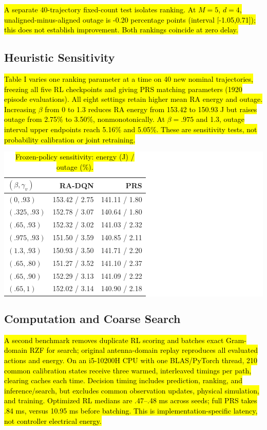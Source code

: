 \documentclass[letterpaper,conference]{IEEEtran}
\newcommand{\rev}[1]{\hl{#1}}
\newcommand{\revbox}[1]{\colorbox{white}{#1}}
\newcommand{\rev}[1]{\hl{#1}}
\newcommand{\revbox}[1]{\colorbox{yellow}{#1}}
\begin{document}
\rev{A separate 40-trajectory fixed-count test isolates ranking. At $M=5$, $d=4$, unaligned-minus-aligned outage is -0.20 percentage points (interval [-1.05,0.71]); this does not establish improvement. Both rankings coincide at zero delay.}

\subsection{Heuristic Sensitivity}
\rev{Table I varies one ranking parameter at a time on 40 new nominal trajectories, freezing all five RL checkpoints and giving PRS matching parameters (1920 episode evaluations). All eight settings retain higher mean RA energy and outage. Increasing $\beta$ from 0 to 1.3 reduces RA energy from 153.42 to 150.93 J but raises outage from 2.75\% to 3.50\%, nonmonotonically. At $\beta=.975$ and 1.3, outage interval upper endpoints reach 5.16\% and 5.05\%. These are sensitivity tests, not probability calibration or joint retraining.}
\begin{table}[!t]
\caption{\rev{Frozen-policy sensitivity: energy (J) / outage (\%).}}
\label{tab:sensitivity}
\centering\footnotesize
\revbox{\begin{tabular}{@{}lrr@{}}
\toprule
$(\beta,\gamma_v)$ & RA-DQN & PRS\\
\midrule
$(0,.93)$ & 153.42 / 2.75 & 141.11 / 1.80\\
$(.325,.93)$ & 152.78 / 3.07 & 140.64 / 1.80\\
$(.65,.93)$ & 152.32 / 3.02 & 141.03 / 2.32\\
$(.975,.93)$ & 151.50 / 3.59 & 140.85 / 2.11\\
$(1.3,.93)$ & 150.93 / 3.50 & 141.71 / 2.20\\
$(.65,.80)$ & 151.27 / 3.52 & 141.10 / 2.37\\
$(.65,.90)$ & 152.29 / 3.13 & 141.09 / 2.22\\
$(.65,1)$ & 152.02 / 3.14 & 140.90 / 2.18\\
\bottomrule
\end{tabular}}
\end{table}

\subsection{Computation and Coarse Search}
\rev{A second benchmark removes duplicate RL scoring and batches exact Gram-domain RZF for search; original antenna-domain replay reproduces all evaluated actions and energy. On an i5-10200H CPU with one BLAS/PyTorch thread, 210 common calibration states receive three warmed, interleaved timings per path, clearing caches each time. Decision timing includes prediction, ranking, and inference/search, but excludes common observation updates, physical simulation, and training. Optimized RL medians are .47--.48 ms across seeds; full PRS takes .84 ms, versus 10.95 ms before batching. This is implementation-specific latency, not controller electrical energy.}
\end{document}
